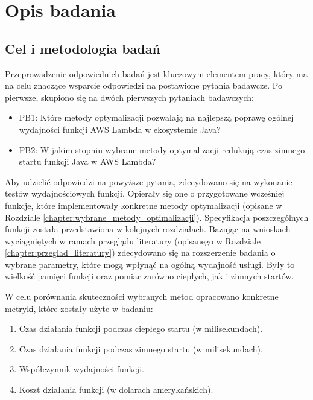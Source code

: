 \chapter{Opis badania}\label{chapter:opis_badania}

\section{Cel i metodologia badań}\label{chapter:cel_i_metodologia_badan}

Przeprowadzenie odpowiednich badań jest kluczowym elementem pracy, który ma na celu znaczące wsparcie odpowiedzi na postawione pytania badawcze.
Po pierwsze, skupiono się na dwóch pierwszych pytaniach badawczych:
\begin{itemize}
    \item PB1: Które metody optymalizacji pozwalają na najlepszą poprawę ogólnej wydajności funkcji AWS Lambda w ekosystemie Java?
    \item PB2: W jakim stopniu wybrane metody optymalizacji redukują czas zimnego startu funkcji Java w AWS Lambda?
\end{itemize}
Aby udzielić odpowiedzi na powyższe pytania, zdecydowano się na wykonanie testów wydajnościowych funkcji.
Opierały się one o przygotowane wcześniej funkcje, które implementowały konkretne metody optymalizacji (opisane w Rozdziale \ref{chapter:wybrane_metody_optimalizacji}).
Specyfikacja poszczególnych funkcji została przedstawiona w kolejnych rozdziałach.
Bazując na wnioskach wyciągniętych w ramach przeglądu literatury (opisanego w Rozdziale \ref{chapter:przeglad_literatury}) zdecydowano się na rozszerzenie badania o wybrane parametry, które mogą wpłynąć na ogólną wydajność usługi.
Były to wielkość pamięci funkcji oraz pomiar zarówno ciepłych, jak i zimnych startów.  

W celu porównania skuteczności wybranych metod opracowano konkretne metryki, które zostały użyte w badaniu:
\begin{enumerate}
    \item Czas działania funkcji podczas ciepłego startu (w milisekundach).
    \item Czas działania funkcji podczas zimnego startu (w milisekundach).
    \item Współczynnik wydajności funkcji.
    \item Koszt działania funkcji (w dolarach amerykańskich).
\end{enumerate}

